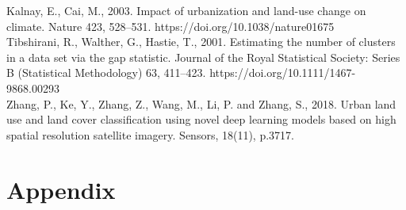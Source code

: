 \documentclass[11pt]{article}
\begin{document}
Kalnay, E., Cai, M., 2003. Impact of urbanization and land-use change on climate. Nature 423, 528–531. https://doi.org/10.1038/nature01675\\

Tibshirani, R., Walther, G., Hastie, T., 2001. Estimating the number of clusters in a data set via the gap statistic. Journal of the Royal Statistical Society: Series B (Statistical Methodology) 63, 411–423. https://doi.org/10.1111/1467-9868.00293\\

Zhang, P., Ke, Y., Zhang, Z., Wang, M., Li, P. and Zhang, S., 2018. Urban land use and land cover classification using novel deep learning models based on high spatial resolution satellite imagery. Sensors, 18(11), p.3717.\\

\section{Appendix}



 
\end{document}
